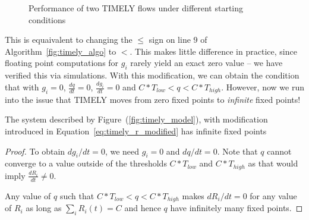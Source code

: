 \begin{figure}[t]
\center
{}
\caption{Performance of two TIMELY flows under different starting conditions}
\label{fig:timely_unstable}
\end{figure}

This is equaivalent to changing the $\le$ sign on line 9 of
Algorithm~\ref{fig:timely_algo} to $<$. This makes little difference in
practice, since floating point computations for $g_i$ rarely yield an exact zero
value -- we have verified this via simulations. With this modification, we can
obtain the condition that with $g_i =0$, $\tfrac{dq}{dt} = 0$, $\tfrac{dg_i}{dt} =
0$ and $C*T_{low} < q < C*T_{high}$. However, now we run into the issue that
TIMELY moves from zero fixed points to \emph{infinite} fixed points!

\begin{thm}
The system described by Figure~(\ref{fig:timely_model}), with
modification introduced in Equation~\ref{eq:timely_r_modified} has
infinite fixed points
\end{thm}
\begin{proof}
To obtain ${dg_i}/{dt} =0$, we need $g_i = 0$ and ${dq}/{dt} = 0$.  Note that $q$
cannot converge to a value outside of the thresholds $ C*{T_{low}}$ and
$C*{T_{high}}$ as that would imply $\frac{dR_i}{dt} \ne 0$.

Any value of $q$ such that $C*T_{low} < q < C*T_{high}$ makes ${dR_i}/{dt} = 0$
for any value of $R_i$ as long as $\sum_{i} R_i(t) =  C$ and hence $q$ have
infinitely many fixed points. 
\end{proof}

